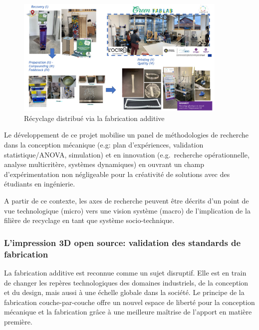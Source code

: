 \documentclass[
  11pt,
]{article}
\begin{document}
\begin{figure}[H]

{\centering \includegraphics[width=0.9\textwidth,height=\textheight]{Figures/INEDIT.jpg}

}

\caption{\label{fig-DRAM-INEDIT}Récyclage distribué via la fabrication
additive}

\end{figure}

Le développement de ce projet mobilise un panel de méthodologies de
recherche dans la conception mécanique (e.g: plan d'expériences,
validation statistique/ANOVA, simulation) et en innovation
(e.g.~recherche opérationnelle, analyse multicritère, systèmes
dynamiques) en ouvrant un champ d'expérimentation non négligeable pour
la créativité de solutions avec des étudiants en ingénierie.

A partir de ce contexte, les axes de recherche peuvent être décrits d'un
point de vue technologique (micro) vers une vision système (macro) de
l'implication de la filière de recyclage en tant que système
socio-technique.

\hypertarget{limpression-3d-open-source-validation-des-standards-de-fabrication}{%
\subsubsection{L'impression 3D open source: validation des standards de
fabrication}\label{limpression-3d-open-source-validation-des-standards-de-fabrication}}

La fabrication additive est reconnue comme un sujet disruptif. Elle est
en train de changer les repères technologiques des domaines industriels,
de la conception et du design, mais aussi à une échelle globale dans la
société. Le principe de la fabrication couche-par-couche offre un nouvel
espace de liberté pour la conception mécanique et la fabrication grâce à
une meilleure maîtrise de l'apport en matière première.
\end{document}
